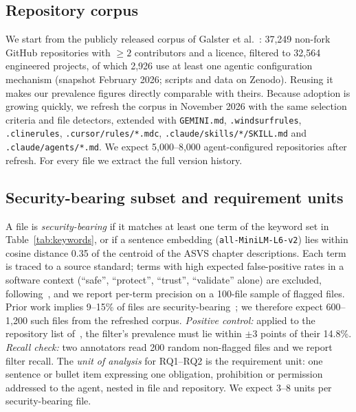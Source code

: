 \documentclass[10pt,conference]{IEEEtran}
\begin{document}
\subsection{Repository corpus}
We start from the publicly released corpus of Galster et al.~\cite{galster2026configuring}: 37,249 non-fork GitHub repositories with $\geq2$ contributors and a licence, filtered to 32,564 engineered projects, of which 2,926 use at least one agentic configuration mechanism (snapshot February 2026; scripts and data on Zenodo). Reusing it makes our prevalence figures directly comparable with theirs. Because adoption is growing quickly, we refresh the corpus in November 2026 with the same selection criteria and file detectors, extended with \texttt{GEMINI.md}, \texttt{.windsurfrules}, \texttt{.clinerules}, \texttt{.cursor/rules/*.mdc}, \texttt{.claude/skills/*/SKILL.md} and \texttt{.claude/agents/*.md}. We expect 5,000--8,000 agent-configured repositories after refresh. For every file we extract the full version history.

\subsection{Security-bearing subset and requirement units}
A file is \emph{security-bearing} if it matches at least one term of the keyword set in Table~\ref{tab:keywords}, or if a sentence embedding (\texttt{all-MiniLM-L6-v2}) lies within cosine distance 0.35 of the centroid of the ASVS chapter descriptions. Each term is traced to a source standard; terms with high expected false-positive rates in a software context (``safe'', ``protect'', ``trust'', ``validate'' alone) are excluded, following~\cite{hennig2023privacy}, and we report per-term precision on a 100-file sample of flagged files. Prior work implies 9--15\% of files are security-bearing~\cite{chatlatanagulchai2025manifests,chatlatanagulchai2026readmes}; we therefore expect 600--1,200 such files from the refreshed corpus. \emph{Positive control:} applied to the repository list of~\cite{chatlatanagulchai2026readmes}, the filter's prevalence must lie within $\pm3$ points of their 14.8\%. \emph{Recall check:} two annotators read 200 random non-flagged files and we report filter recall. The \emph{unit of analysis} for RQ1--RQ2 is the requirement unit: one sentence or bullet item expressing one obligation, prohibition or permission addressed to the agent, nested in file and repository. We expect 3--8 units per security-bearing file.
\end{document}
